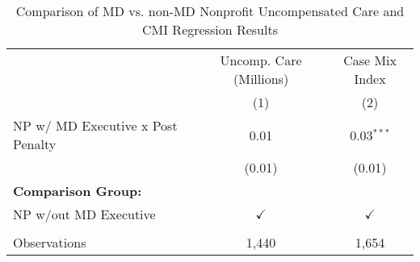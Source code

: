 \begin{table}[htbp]
   \caption{\label{tab:MD_noMD_uncomp_CMI_fullsample} Comparison of MD vs. non-MD Nonprofit Uncompensated Care and CMI Regression Results}
   \bigskip
   \centering
   \begin{tabular}{lcc}
      \toprule
                                        & Uncomp. Care (Millions) & Case Mix Index\\  
                                        & (1)                     & (2)\\  
      \midrule 
      NP w/ MD Executive x Post Penalty & 0.01                    & 0.03$^{***}$\\   
                                        & (0.01)                  & (0.01)\\   
      \textbf{Comparison Group:}        &                         & \\  
      NP w/out MD Executive             & $\checkmark$            & $\checkmark$\\   
       \\
      Observations                      & 1,440                   & 1,654\\  
      \bottomrule
   \end{tabular}
\end{table}
